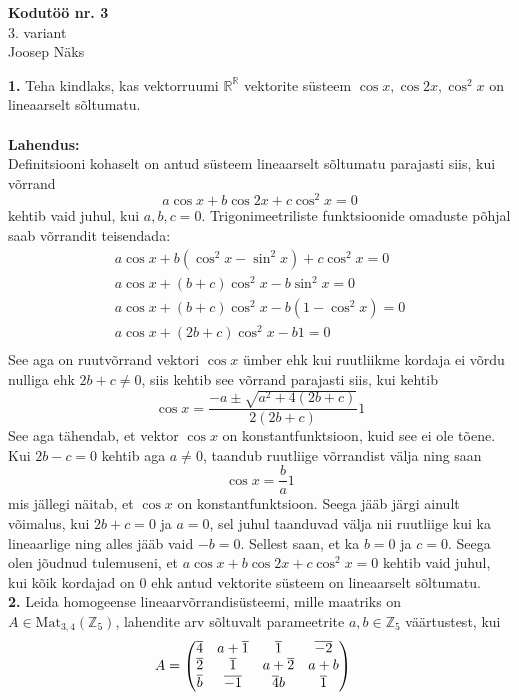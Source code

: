 \documentclass{article}
\newcommand\q[1]{\overline{#1}}
\begin{document}
\begin{center}
\Large\textbf{Kodutöö nr. 3}\\
3. variant\\
\small{Joosep Näks}
\end{center}
\textbf{1. }Teha kindlaks, kas vektorruumi $\mathbb{R}^\mathbb{R}$ vektorite süsteem $\cos x, \cos 2x, \cos^2x$ on lineaarselt sõltumatu.\\\\
\textbf{Lahendus:}\\
Definitsiooni kohaselt on antud süsteem lineaarselt sõltumatu parajasti siis, kui võrrand $$a\cos x+ b\cos 2x+ c\cos^2x=0$$ kehtib vaid juhul, kui $a,b,c=0$. Trigonimeetriliste funktsioonide omaduste põhjal saab võrrandit teisendada:
\begin{gather*}
a\cos x+ b(\cos^2 x-\sin^2x)+ c\cos^2x=0\\
a\cos x+ (b+c)\cos^2 x-b\sin^2x=0\\
a\cos x+ (b+c)\cos^2 x-b(1-\cos^2x)=0\\
a\cos x+ (2b+c)\cos^2 x-b1=0\\
\end{gather*}
See aga on ruutvõrrand vektori $\cos x$ ümber ehk kui ruutliikme kordaja ei võrdu nulliga ehk $2b+c\neq0$, siis kehtib see võrrand parajasti siis, kui kehtib $$\cos x=\frac{-a\pm\sqrt{a^2+4(2b+c)}}{2(2b+c)}1$$ See aga tähendab, et vektor $\cos x$ on konstantfunktsioon, kuid see ei ole tõene. Kui $2b-c=0$ kehtib aga $a\neq0$, taandub ruutliige võrrandist välja ning saan $$\cos x=\frac{b}{a}1$$mis jällegi näitab, et $\cos x$ on konstantfunktsioon. Seega jääb järgi ainult võimalus, kui $2b+c=0$ ja $a=0$, sel juhul taanduvad välja nii ruutliige kui ka lineaarlige ning alles jääb vaid $-b=0$. Sellest saan, et ka $b=0$ ja $c=0$. Seega olen jõudnud tulemuseni, et $a\cos x+ b\cos 2x+ c\cos^2x=0$ kehtib vaid juhul, kui kõik kordajad on 0 ehk antud vektorite süsteem on lineaarselt sõltumatu.\pagebreak\\
\textbf{2. }Leida homogeense lineaarvõrrandisüsteemi, mille maatriks on $A\in \text{Mat} _{3,4}(\mathbb{Z}_5)$, lahendite arv sõltuvalt parameetrite $a,b\in\mathbb{Z}_5$ väärtustest, kui
\begin{align}
A&=\begin{pmatrix}
\q{4} & a+\q{1} & \q{1} & \q{-2}\\
\q{2} & \q{1} & a+\q{2} & a+b\\
\q{b} & \q{-1} & \q{4}b & \q{1}\notag
\end{pmatrix}
\end{align}\\\\
\end{document}
